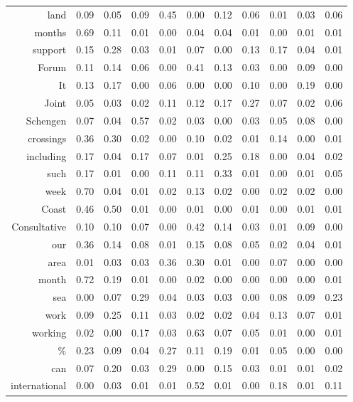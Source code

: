 \begin{longtable}{rrrrrrrrrrr}
  land & 0.09 & 0.05 & 0.09 & 0.45 & 0.00 & 0.12 & 0.06 & 0.01 & 0.03 & 0.06 \\ 
  months & 0.69 & 0.11 & 0.01 & 0.00 & 0.04 & 0.04 & 0.01 & 0.00 & 0.01 & 0.01 \\ 
  support & 0.15 & 0.28 & 0.03 & 0.01 & 0.07 & 0.00 & 0.13 & 0.17 & 0.04 & 0.01 \\ 
  Forum & 0.11 & 0.14 & 0.06 & 0.00 & 0.41 & 0.13 & 0.03 & 0.00 & 0.09 & 0.00 \\ 
  It & 0.13 & 0.17 & 0.00 & 0.06 & 0.00 & 0.00 & 0.10 & 0.00 & 0.19 & 0.00 \\ 
  Joint & 0.05 & 0.03 & 0.02 & 0.11 & 0.12 & 0.17 & 0.27 & 0.07 & 0.02 & 0.06 \\ 
  Schengen & 0.07 & 0.04 & 0.57 & 0.02 & 0.03 & 0.00 & 0.03 & 0.05 & 0.08 & 0.00 \\ 
  crossings & 0.36 & 0.30 & 0.02 & 0.00 & 0.10 & 0.02 & 0.01 & 0.14 & 0.00 & 0.01 \\ 
  including & 0.17 & 0.04 & 0.17 & 0.07 & 0.01 & 0.25 & 0.18 & 0.00 & 0.04 & 0.02 \\ 
  such & 0.17 & 0.01 & 0.00 & 0.11 & 0.11 & 0.33 & 0.01 & 0.00 & 0.01 & 0.05 \\ 
  week & 0.70 & 0.04 & 0.01 & 0.02 & 0.13 & 0.02 & 0.00 & 0.02 & 0.02 & 0.00 \\ 
  Coast & 0.46 & 0.50 & 0.01 & 0.00 & 0.01 & 0.00 & 0.01 & 0.00 & 0.01 & 0.01 \\ 
  Consultative & 0.10 & 0.10 & 0.07 & 0.00 & 0.42 & 0.14 & 0.03 & 0.01 & 0.09 & 0.00 \\ 
  our & 0.36 & 0.14 & 0.08 & 0.01 & 0.15 & 0.08 & 0.05 & 0.02 & 0.04 & 0.01 \\ 
  area & 0.01 & 0.03 & 0.03 & 0.36 & 0.30 & 0.01 & 0.00 & 0.07 & 0.00 & 0.00 \\ 
  month & 0.72 & 0.19 & 0.01 & 0.00 & 0.02 & 0.00 & 0.00 & 0.00 & 0.00 & 0.01 \\ 
  sea & 0.00 & 0.07 & 0.29 & 0.04 & 0.03 & 0.03 & 0.00 & 0.08 & 0.09 & 0.23 \\ 
  work & 0.09 & 0.25 & 0.11 & 0.03 & 0.02 & 0.02 & 0.04 & 0.13 & 0.07 & 0.01 \\ 
  working & 0.02 & 0.00 & 0.17 & 0.03 & 0.63 & 0.07 & 0.05 & 0.01 & 0.00 & 0.01 \\ 
  \% & 0.23 & 0.09 & 0.04 & 0.27 & 0.11 & 0.19 & 0.01 & 0.05 & 0.00 & 0.00 \\ 
  can & 0.07 & 0.20 & 0.03 & 0.29 & 0.00 & 0.15 & 0.03 & 0.01 & 0.01 & 0.02 \\ 
  international & 0.00 & 0.03 & 0.01 & 0.01 & 0.52 & 0.01 & 0.00 & 0.18 & 0.01 & 0.11 \\ 

\end{longtable}
